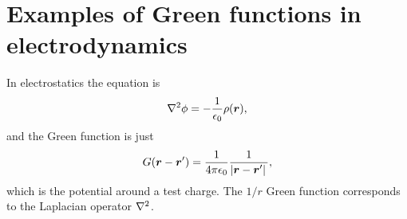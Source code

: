 \documentclass[hyperref, a4paper]{article}
\begin{document}
\section{Examples of Green functions in electrodynamics}

In electrostatics the equation is 
\begin{equation}
    \laplacian \phi = - \frac{1}{\epsilon_0} \rho(\vb*{r}),
\end{equation}
and the Green function is just 
\begin{equation}
    G(\vb*{r} - \vb*{r}') = \frac{1}{4 \pi \epsilon_0} \frac{1}{\abs*{\vb*{r} - \vb*{r}'}},
\end{equation}
which is the potential around a test charge.
The $1/r$ Green function corresponds to the Laplacian operator $\laplacian$.
\end{document}
